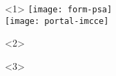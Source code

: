 \begin{frame}
\begin{columns}[T]
\begin{column}{.4\textwidth}
\begin{overlayarea}{\textwidth}{\textheight}
        \begin{onlyenv}<1>
          \texttt{[image: form-psa]}\\
        \vspace{1.0em}
          \texttt{[image: portal-imcce]}
        \end{onlyenv}

        \begin{onlyenv}<2>
        \end{onlyenv}

        \begin{onlyenv}<3>
        \end{onlyenv}

      \end{overlayarea}
    \end{column}

  \end{columns}

\end{frame}


